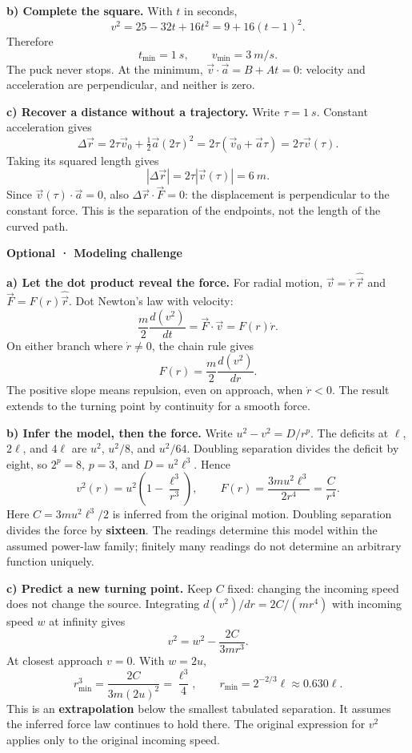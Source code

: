 \documentclass[11pt,a4paper]{article}
\begin{document}
\textbf{b) Complete the square.} With $t$ in seconds,
\[
v^2=25-32t+16t^2=9+16(t-1)^2.
\]
Therefore
\[
\boxed{t_{\min}=\SI{1}{s},\qquad v_{\min}=\SI{3}{m/s}.}
\]
The puck never stops. At the minimum, $\vec v\cdot\vec a=B+At=0$:
velocity and acceleration are perpendicular, and neither is zero.

\textbf{c) Recover a distance without a trajectory.} Write
$\tau=\SI{1}{s}$. Constant acceleration gives
\[
\Delta\vec r=2\tau\vec v_0+\tfrac12\vec a(2\tau)^2
=2\tau(\vec v_0+\vec a\tau)=2\tau\vec v(\tau).
\]
Taking its squared length gives
\[
\boxed{|\Delta\vec r|=2\tau|\vec v(\tau)|=\SI{6}{m}.}
\]
Since $\vec v(\tau)\cdot\vec a=0$, also
$\Delta\vec r\cdot\vec F=0$: the displacement is perpendicular to the
constant force. This is the separation of the endpoints, not the length
of the curved path.


\clearpage
{}
{\color{VectorCoral}\bfseries Optional · Modeling challenge}

\textbf{a) Let the dot product reveal the force.}
For radial motion, $\vec v=\dot r\,\hat{\vec r}$ and
$\vec F=F(r)\hat{\vec r}$. Dot Newton's law with velocity:
\[
\frac m2\frac{d(v^2)}{dt}=\vec F\cdot\vec v=F(r)\dot r.
\]
On either branch where $\dot r\ne0$, the chain rule gives
\[
\boxed{F(r)=\frac m2\frac{d(v^2)}{dr}.}
\]
The positive slope means repulsion, even on approach, when $\dot r<0$.
The result extends to the turning point by continuity for a smooth force.

\textbf{b) Infer the model, then the force.}
Write $u^2-v^2=D/r^p$. The deficits at $\ell$, $2\ell$, and $4\ell$
are $u^2$, $u^2/8$, and $u^2/64$. Doubling separation divides the
deficit by eight, so $2^p=8$, $p=3$, and $D=u^2\ell^3$. Hence
\[
\boxed{v^2(r)=u^2\left(1-\frac{\ell^3}{r^3}\right),
\qquad F(r)=\frac{3mu^2\ell^3}{2r^4}=\frac{C}{r^4}.}
\]
Here $C=3mu^2\ell^3/2$ is inferred from the original motion.
Doubling separation divides the force by \textbf{sixteen}.
The readings determine this model within the assumed power-law family;
finitely many readings do not determine an arbitrary function uniquely.

\textbf{c) Predict a new turning point.}
Keep $C$ fixed: changing the incoming speed does not change the source.
Integrating $d(v^2)/dr=2C/(mr^4)$ with incoming speed $w$ at infinity gives
\[
v^2=w^2-\frac{2C}{3mr^3}.
\]
At closest approach $v=0$. With $w=2u$,
\[
\boxed{r_{\min}^3=\frac{2C}{3m(2u)^2}=\frac{\ell^3}{4},
\qquad r_{\min}=2^{-2/3}\ell\approx0.630\ell.}
\]
This is an \textbf{extrapolation} below the smallest tabulated separation.
It assumes the inferred force law continues to hold there. The original
expression for $v^2$ applies only to the original incoming speed.
\end{document}
